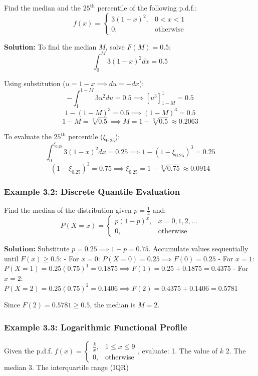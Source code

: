 \documentclass[
]{article}
\begin{document}
Find the median and the \(25^{\text{th}}\) percentile of the following
p.d.f.:
\[f(x) = \begin{cases} 3(1-x)^2, & 0 < x < 1 \\ 0, & \text{otherwise} \end{cases}\]

\textbf{Solution:} To find the median \(M\), solve \(F(M) = 0.5\):
\[\int_{0}^{M} 3(1-x)^2 dx = 0.5\]

Using substitution (\(u = 1-x \implies du = -dx\)):
\[-\int_{1}^{1-M} 3u^2 du = 0.5 \implies \left[ u^3 \right]_{1-M}^{1} = 0.5\]
\[1 - (1-M)^3 = 0.5 \implies (1-M)^3 = 0.5\]
\[1 - M = \sqrt[3]{0.5} \implies M = 1 - \sqrt[3]{0.5} \approx 0.2063\]

To evaluate the \(25^{\text{th}}\) percentile (\(\xi_{0.25}\)):
\[\int_{0}^{\xi_{0.25}} 3(1-x)^2 dx = 0.25 \implies 1 - (1-\xi_{0.25})^3 = 0.25\]
\[(1-\xi_{0.25})^3 = 0.75 \implies \xi_{0.25} = 1 - \sqrt[3]{0.75} \approx 0.0914\]

\subsubsection{Example 3.2: Discrete Quantile
Evaluation}\label{example-3.2-discrete-quantile-evaluation}

Find the median of the distribution given \(p = \frac{1}{4}\) and:
\[P(X=x) = \begin{cases} p(1-p)^x, & x = 0, 1, 2, \dots \\ 0, & \text{otherwise} \end{cases}\]

\textbf{Solution:} Substitute \(p = 0.25 \implies 1-p = 0.75\).
Accumulate values sequentially until \(F(x) \ge 0.5\): - For \(x = 0\):
\(P(X=0) = 0.25 \implies F(0) = 0.25\) - For \(x = 1\):
\(P(X=1) = 0.25(0.75)^1 = 0.1875 \implies F(1) = 0.25 + 0.1875 = 0.4375\)
- For \(x = 2\):
\(P(X=2) = 0.25(0.75)^2 = 0.1406 \implies F(2) = 0.4375 + 0.1406 = 0.5781\)

Since \(F(2) = 0.5781 \ge 0.5\), the median is \(M = 2\).

\subsubsection{Example 3.3: Logarithmic Functional
Profile}\label{example-3.3-logarithmic-functional-profile}

Given the p.d.f.
\(f(x) = \begin{cases} \frac{k}{x}, & 1 \le x \le 9 \\ 0, & \text{otherwise} \end{cases}\),
evaluate: 1. The value of \(k\) 2. The median 3. The interquartile range
(IQR)
\end{document}
